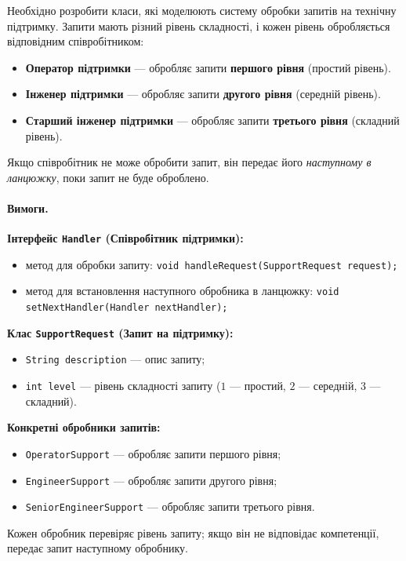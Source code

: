 \documentclass[12pt,a4paper]{article}
\begin{document}
    Необхідно розробити класи, які моделюють систему обробки запитів на технічну підтримку. Запити мають різний рівень складності, і кожен рівень обробляється відповідним співробітником:
    \begin{itemize}
    \item \textbf{Оператор підтримки} — обробляє запити \textbf{першого рівня} (простий рівень).
    \item \textbf{Інженер підтримки} — обробляє запити \textbf{другого рівня} (середній рівень).
    \item \textbf{Старший інженер підтримки} — обробляє запити \textbf{третього рівня} (складний рівень).
    \end{itemize}
    Якщо співробітник не може обробити запит, він передає його \textit{наступному в ланцюжку}, поки запит не буде оброблено.

    \paragraph{Вимоги.}
    \textbf{Інтерфейс \texttt{Handler} (Співробітник підтримки):}
    \begin{itemize}
    \item метод для обробки запиту: \verb|void handleRequest(SupportRequest request);|
    \item метод для встановлення наступного обробника в ланцюжку: \verb|void setNextHandler(Handler nextHandler);|
    \end{itemize}

    \textbf{Клас \texttt{SupportRequest} (Запит на підтримку):}
    \begin{itemize}
    \item \verb|String description| — опис запиту;
    \item \verb|int level| — рівень складності запиту (\(1\) — простий, \(2\) — середній, \(3\) — складний).
    \end{itemize}

    \textbf{Конкретні обробники запитів:}
    \begin{itemize}
    \item \texttt{OperatorSupport} — обробляє запити першого рівня;
    \item \texttt{EngineerSupport} — обробляє запити другого рівня;
    \item \texttt{SeniorEngineerSupport} — обробляє запити третього рівня.
    \end{itemize}
    Кожен обробник перевіряє рівень запиту; якщо він не відповідає компетенції, передає запит наступному обробнику.
\end{document}
